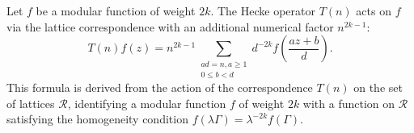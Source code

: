 Let $f$ be a modular function of weight $2k$. The Hecke operator $T(n)$ acts on $f$ via the lattice correspondence with an additional numerical factor $n^{2k-1}$:
$$T(n)f(z) = n^{2k-1} \sum_{\substack{ad = n, a \geq 1 \\ 0 \leq b < d}} d^{-2k} f\left(\frac{az + b}{d}\right).$$
This formula is derived from the action of the correspondence $T(n)$ on the set of lattices $\mathcal{R}$, identifying a modular function $f$ of weight $2k$ with a function on $\mathcal{R}$ satisfying the homogeneity condition $f(\lambda\Gamma) = \lambda^{-2k} f(\Gamma)$.
